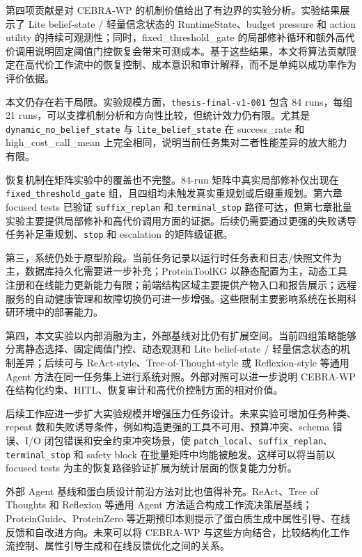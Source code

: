第四项贡献是对 CEBRA-WP 的机制价值给出了有边界的实验分析。实验结果展示了
Lite belief-state / 轻量信念状态的 RuntimeState、budget pressure 和
action utility 的持续可观测性；同时，fixed\_threshold\_gate
的局部修补循环和额外高代价调用说明固定阈值门控恢复会带来可测成本。基于这些结果，本文将算法贡献限定在高代价工作流中的恢复控制、成本意识和审计解释，而不是单纯以成功率作为评价依据。

本文仍存在若干局限。实验规模方面，\texttt{thesis-final-v1-001} 包含 84
runs，每组 21
runs，可以支撑机制分析和方向性比较，但统计效力仍有限。尤其是
\texttt{dynamic\_no\_belief\_state} 与 \texttt{lite\_belief\_state} 在
success\_rate 和 high\_cost\_call\_mean
上完全相同，说明当前任务集对二者性能差异的放大能力有限。

恢复机制在矩阵实验中的覆盖也不完整。84-run 矩阵中真实局部修补仅出现在
\texttt{fixed\_threshold\_gate}
组，且四组均未触发真实重规划或后缀重规划。第六章 focused tests 已验证
\texttt{suffix\_replan} 和 \texttt{terminal\_stop}
路径可达，但第七章批量实验主要提供局部修补和高代价调用方面的证据。后续仍需要通过更强的失败诱导任务补足重规划、\texttt{stop}
和 escalation 的矩阵级证据。

第三，系统仍处于原型阶段。当前任务记录以运行时任务表和日志/快照文件为主，数据库持久化需要进一步补充；ProteinToolKG
以静态配置为主，动态工具注册和在线能力更新能力有限；前端结构区域主要提供产物入口和报告展示；远程服务的自动健康管理和故障切换仍可进一步增强。这些限制主要影响系统在长期科研环境中的部署能力。

第四，本文实验以内部消融为主，外部基线对比仍有扩展空间。当前四组策略能够分离静态选择、固定阈值门控、动态观测和
Lite belief-state / 轻量信念状态的机制差异；后续可与
ReAct-style、Tree-of-Thought-style 或 Reflexion-style 等通用 Agent
方法在同一任务集上进行系统对照。外部对照可以进一步说明 CEBRA-WP
在结构化约束、HITL、恢复审计和高代价控制方面的相对价值。

后续工作应进一步扩大实验规模并增强压力任务设计。未来实验可增加任务种类、repeat
数和失败诱导条件，例如构造更强的工具不可用、预算冲突、schema 错误、I/O
闭包错误和安全约束冲突场景，使
\texttt{patch\_local}、\texttt{suffix\_replan}、\texttt{terminal\_stop}
和 safety block 在批量矩阵中均能被触发。这样可以将当前以 focused tests
为主的恢复路径验证扩展为统计层面的恢复能力分析。

外部 Agent 基线和蛋白质设计前沿方法对比也值得补充。ReAct、Tree of
Thoughts 和 Reflexion 等通用 Agent
方法适合构成工作流决策层基线；ProteinGuide、ProteinZero
等近期预印本则提示了蛋白质生成中属性引导、在线反馈和自改进方向\citep{proteinguide2025, proteinzero2025}。未来可以将
CEBRA-WP
与这些方向结合，比较结构化工作流控制、属性引导生成和在线反馈优化之间的关系。

